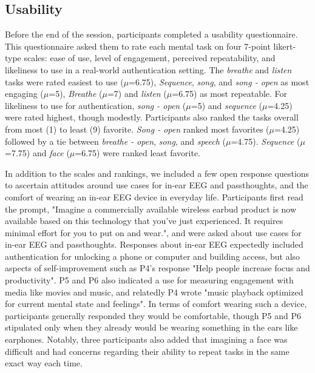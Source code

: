 \documentclass[a4paper,twoside]{article}
\begin{document}
\subsection{Usability}

\noindent Before the end of the session, participants completed a usability questionnaire. This questionnaire asked them to rate each mental task on four 7-point likert-type scales: ease of use, level of engagement, perceived repeatability, and likeliness to use in a real-world authentication setting. The \textit{breathe} and \textit{listen} tasks were rated easiest to use (\(\mu\)=6.75), \textit{Sequence}, \textit{song}, and \textit{song - open} as most engaging (\(\mu\)=5), \textit{Breathe} (\(\mu\)=7) and \textit{listen} (\(\mu\)=6.75) as most repeatable. For likeliness to use for authentication, \textit{song - open} (\(\mu\)=5) and \textit{sequence} (\(\mu\)=4.25) were rated highest, though modestly. Participants also ranked the tasks overall from most (1) to least (9) favorite. \textit{Song - open} ranked most favorites (\(\mu\)=4.25) followed by a tie between \textit{breathe - open}, \textit{song}, and \textit{speech} (\(\mu\)=4.75). \textit{Sequence} (\(\mu\)=7.75) and \textit{face} (\(\mu\)=6.75) were ranked least favorite.

In addition to the scales and rankings, we included a few open response questions to ascertain attitudes around use cases for in-ear EEG and passthoughts, and the comfort of wearing an in-ear EEG device in everyday life. Participants first read the prompt, "Imagine a commercially available wireless earbud product is now available based on this technology that you've just experienced. It requires minimal effort for you to put on and wear.", and were asked about use cases for in-ear EEG and passthoughts. Responses about in-ear EEG expectedly included authentication for unlocking a phone or computer and building access, but also aspects of self-improvement such as P4's response "Help people increase focus and productivity". P5 and P6 also indicated a use for measuring engagement with media like movies and music, and relatedly P4 wrote "music playback optimized for current mental state and feelings". In terms of comfort wearing such a device, participants generally responded they would be comfortable, though P5 and P6 stipulated only when they already would be wearing something in the ears like earphones. Notably, three participants also added that imagining a face was difficult and had concerns regarding their ability to repeat tasks in the same exact way each time.
\end{document}
